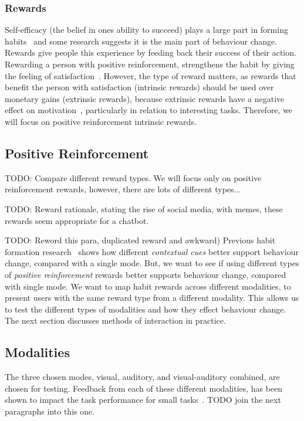 \documentclass{scaffold/sigchi}
\begin{document}
\subsubsection{Rewards}
Self-efficacy (the belief in ones ability to succeed) plays a large part in forming habits~\cite{article_a_self_efficacy} and some research suggests it is the main part of behaviour change. Rewards give people this experience by feeding back their success of their action. Rewarding a person with positive reinforcement, strengthens the habit by giving the feeling of satisfaction~\cite{article_promoting_habit_formation}. However, the type of reward matters, as rewards that benefit the person with satisfaction (intrinsic rewards) should be used over monetary gains (extrinsic rewards), because extrinsic rewards have a negative effect on motivation~\cite{article_meta_analytic_review_intrinsic_motivation}, particularly in relation to interesting tasks. Therefore, we will focus on positive reinforcement intrinsic rewards.



\subsection{Positive Reinforcement}
TODO: Compare different reward types. We will focus only on positive reinforcement rewards, however, there are lots of different types...

TODO: Reward rationale, stating the rise of social media, with memes, these rewards seem appropriate for a chatbot.

TODO: Reword this para, duplicated reward and awkward) Previous habit formation research~\cite{article_understanding_use_contextual_cues_design_impl} shows how different \textit{contextual cues} better support behaviour change, compared with a single mode. But, we want to see if using different types of \textit{positive reinforcement} rewards better supports behaviour change, compared with single mode. We want to map habit rewards across different modalities, to present users with the same reward type from a different modality.
This allows us to test the different types of modalities and how they effect behaviour change.
The next section discusses methods of interaction in practice.

\subsection{Modalities}
The three chosen modes, visual, auditory, and visual-auditory combined, are chosen for testing. Feedback from each of these different modalities, has been shown to impact the task performance for small tasks~\cite{chi_oussama_tap_the_shapetones}. TODO join the next paragraphs into this one.
\end{document}
